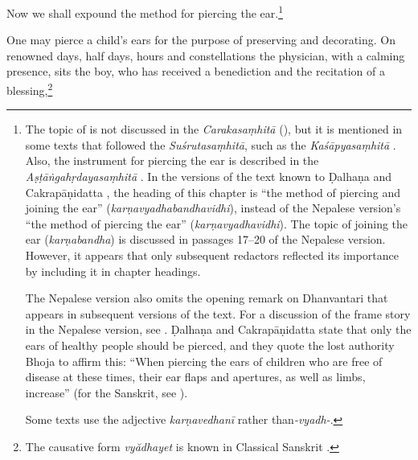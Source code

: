 \begin{translation}    
  
\item [1] 

Now we shall expound the method for piercing the ear.\footnote{The topic of 
     is not discussed in the \emph{Carakasaṃhitā}
    (\cite[IB, 326, n.\,175]{meul-hist}), but it is mentioned in some texts that
    followed the \emph{Suśrutasaṃhitā}, such as the \emph{Kaśāpyasaṃhitā} \citep[IIA,
    30]{meul-hist}. Also, the instrument for piercing the ear is described in the
    \emph{Aṣṭāṅgahṛdayasaṃhitā} . In the versions of the text known
    to Ḍalhaṇa \citep[76]{vulgate} and Cakrapāṇidatta \citep[125]{acar-1939}, the
    heading of this chapter is “the method of piercing and joining the ear”
    (\emph{karṇavyadhabandhavidhi}), instead of the Nepalese version's “the method of
    piercing the ear” (\emph{karṇavyadhavidhi}). The topic of joining the ear
    (\emph{karṇabandha}) is discussed in passages 17--20 of the Nepalese version.
    However, it appears that only subsequent redactors reflected its importance by
    including it in chapter headings.

 The Nepalese version also omits the opening remark on Dhanvantari that appears in
subsequent versions of the text. For a discussion of the frame story in the
Nepalese version, see \cite{birc-2021}. Ḍalhaṇa \citep[76]{vulgate} and
Cakrapāṇidatta \citep[125]{acar-1939} state that only the ears of healthy people
should be pierced, and they quote the lost authority Bhoja to affirm this: “When
piercing the ears of children who are free of disease at these times, their ear
flaps and apertures, as well as limbs, increase” (for the Sanskrit, see
\cite[76]{vulgate}).

Some texts use the adjective \emph{karṇavedhanī} rather than\emph{-vyadh-}.}

\item [2] 

One may pierce a child's ears for the purpose of preserving and decorating. On
renowned days, half days, hours and constellations the physician, with a calming presence, 
sits the
boy, who has received a benediction and the recitation of a blessing,\footnote{The
    causative form \emph{vy\u adhayet} is known in Classical Sanskrit
    \citep[166]{whit-root}.

}
\end{translation}
